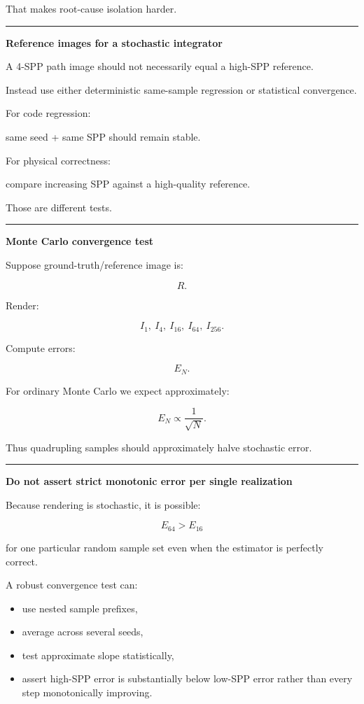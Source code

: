 That makes root-cause isolation harder.

\begin{center}\rule{0.5\linewidth}{0.5pt}\end{center}

\textbf{Reference images for a stochastic integrator}

A 4-SPP path image should not necessarily equal a high-SPP reference.

Instead use either deterministic same-sample regression or statistical convergence.

For code regression:

same seed + same SPP should remain stable.

For physical correctness:

compare increasing SPP against a high-quality reference.

Those are different tests.

\begin{center}\rule{0.5\linewidth}{0.5pt}\end{center}

\textbf{Monte Carlo convergence test}

Suppose ground-truth/reference image is:

\[
R.
\]

Render:

\[
I_1,\ I_4,\ I_{16},\ I_{64},\ I_{256}.
\]

Compute errors:

\[
E_N.
\]

For ordinary Monte Carlo we expect approximately:

\[
\boxed{
E_N
\propto
\frac1{\sqrt N}.
}
\]

Thus quadrupling samples should approximately halve stochastic error.

\begin{center}\rule{0.5\linewidth}{0.5pt}\end{center}

\textbf{Do not assert strict monotonic error per single realization}

Because rendering is stochastic, it is possible:

\[
E_{64}>E_{16}
\]

for one particular random sample set even when the estimator is perfectly correct.

A robust convergence test can:

\begin{itemize}
\tightlist
\item
  use nested sample prefixes,
\item
  average across several seeds,
\item
  test approximate slope statistically,
\item
  assert high-SPP error is substantially below low-SPP error rather than every step monotonically improving.
\end{itemize}

